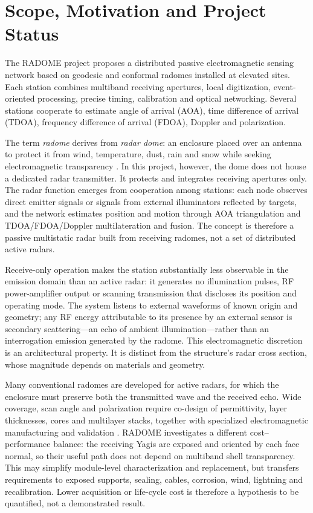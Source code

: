\chapter{Scope, Motivation and Project Status}

The RADOME project proposes a distributed passive electromagnetic sensing network based on geodesic and conformal radomes installed at elevated sites. Each station combines multiband receiving apertures, local digitization, event-oriented processing, precise timing, calibration and optical networking. Several stations cooperate to estimate angle of arrival (AOA), time difference of arrival (TDOA), frequency difference of arrival (FDOA), Doppler and polarization.

The term \emph{radome} derives from \emph{radar dome}: an enclosure placed over an antenna to protect it from wind, temperature, dust, rain and snow while seeking electromagnetic transparency \cite{qamar2020}. In this project, however, the dome does not house a dedicated radar transmitter. It protects and integrates receiving apertures only. The radar function emerges from cooperation among stations: each node observes direct emitter signals or signals from external illuminators reflected by targets, and the network estimates position and motion through AOA triangulation and TDOA/FDOA/Doppler multilateration and fusion. The concept is therefore a passive multistatic radar built from receiving radomes, not a set of distributed active radars.

Receive-only operation makes the station substantially less observable in the emission domain than an active radar: it generates no illumination pulses, RF power-amplifier output or scanning transmission that discloses its position and operating mode. The system listens to external waveforms of known origin and geometry; any RF energy attributable to its presence by an external sensor is secondary scattering---an echo of ambient illumination---rather than an interrogation emission generated by the radome. This electromagnetic discretion is an architectural property. It is distinct from the structure's radar cross section, whose magnitude depends on materials and geometry.

Many conventional radomes are developed for active radars, for which the enclosure must preserve both the transmitted wave and the received echo. Wide coverage, scan angle and polarization require co-design of permittivity, layer thicknesses, cores and multilayer stacks, together with specialized electromagnetic manufacturing and validation \cite{qamar2020,ramanamurthy2016}. RADOME investigates a different cost--performance balance: the receiving Yagis are exposed and oriented by each face normal, so their useful path does not depend on multiband shell transparency. This may simplify module-level characterization and replacement, but transfers requirements to exposed supports, sealing, cables, corrosion, wind, lightning and recalibration. Lower acquisition or life-cycle cost is therefore a hypothesis to be quantified, not a demonstrated result.

